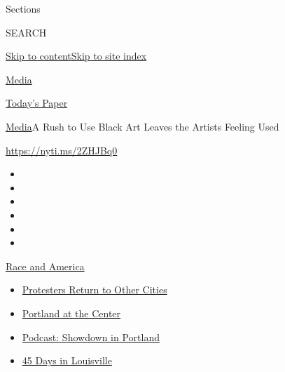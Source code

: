 Sections

SEARCH

\protect\hyperlink{site-content}{Skip to
content}\protect\hyperlink{site-index}{Skip to site index}

\href{https://www.nytimes.com/section/business/media}{Media}

\href{https://myaccount.nytimes.com/auth/login?response_type=cookie\&client_id=vi}{}

\href{https://www.nytimes.com/section/todayspaper}{Today's Paper}

\href{/section/business/media}{Media}\textbar{}A Rush to Use Black Art
Leaves the Artists Feeling Used

\url{https://nyti.ms/2ZHJBq0}

\begin{itemize}
\item
\item
\item
\item
\item
\item
\end{itemize}

\href{https://www.nytimes.com/news-event/george-floyd-protests-minneapolis-new-york-los-angeles?action=click\&pgtype=Article\&state=default\&region=TOP_BANNER\&context=storylines_menu}{Race
and America}

\begin{itemize}
\tightlist
\item
  \href{https://www.nytimes.com/2020/07/26/us/protests-portland-seattle-trump.html?action=click\&pgtype=Article\&state=default\&region=TOP_BANNER\&context=storylines_menu}{Protesters
  Return to Other Cities}
\item
  \href{https://www.nytimes.com/2020/07/24/us/portland-oregon-protests-white-race.html?action=click\&pgtype=Article\&state=default\&region=TOP_BANNER\&context=storylines_menu}{Portland
  at the Center}
\item
  \href{https://www.nytimes.com/2020/07/23/podcasts/the-daily/portland-protests.html?action=click\&pgtype=Article\&state=default\&region=TOP_BANNER\&context=storylines_menu}{Podcast:
  Showdown in Portland}
\item
  \href{https://www.nytimes.com/interactive/2020/07/16/us/black-lives-matter-protests-louisville-breonna-taylor.html?action=click\&pgtype=Article\&state=default\&region=TOP_BANNER\&context=storylines_menu}{45
  Days in Louisville}
\end{itemize}

